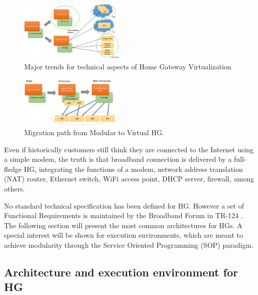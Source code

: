 

\begin{figure}
  \begin{center}
    \includegraphics[width=0.45\textwidth,natwidth=7838,natheight=4517]{fig/vhgtrends.png}
  \end{center}
  \caption{ Major trends for technical aspects of Home Gateway Virtualization
    \label{fig:trends}
  }
\end{figure}

\begin{figure}
  \begin{center}
    \includegraphics[width=0.45\textwidth,natwidth=6955,natheight=3398]{fig/vhgMigrationPath.png}
  \end{center}
  \caption{ Migration path from Modular to Virtual HG.
    \label{fig:migration}
  }
\end{figure}


Even if historically customers still think they are connected to the Internet using a simple modem, the truth is that broadband connection is delivered by a full-fledge HG, integrating the functions of a modem, network address translation (NAT) router, Ethernet switch, WiFi access point, DHCP server, firewall, among others.
 
No standard technical specification has been defined for HG. However a set of Functional Requirements is maintained by the Broadband Forum in TR-124 \cite{broadband_forum_functional_2014}.
The following section will present the most common architectures for HGs.
A special interest will be shown for execution environments, which are meant to achieve modularity through the Service Oriented Programming (SOP) paradigm.

\subsection{Architecture and execution environment for HG}


